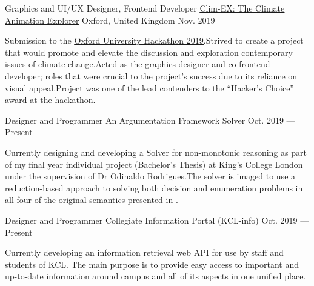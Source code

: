 

\begin{cventries}

\cventry
{Graphics and UI/UX Designer, Frontend Developer} %
{\href{https://github.com/davzzar/clim-AX}{\uline{Clim-EX: The Climate Animation Explorer}}} %
{Oxford, United Kingdom} %
{Nov. 2019} %
{
    \begin{cvitems}
    \bsep Submission to the \href{http://www.ox.ac.uk/students/news/2019-10-14-oxford-hack-2019}{\uline{Oxford University Hackathon 2019}}.\bsep Strived to create a project that would promote and elevate the discussion and exploration contemporary issues of climate change.\bsep Acted as the graphics designer and co-frontend developer; roles that were crucial to the project's success due to its reliance on visual appeal.\bsep Project was one of the lead contenders to the ``Hacker's Choice'' award at the hackathon.
    \end{cvitems}
}

    \cventry
    {Designer and Programmer} %
    {An Argumentation Framework Solver} %
    {} %
    {Oct. 2019 --- Present} %
    {
        \begin{cvitems}
            \bsep Currently designing and developing a \href{https://www.sciencedirect.com/science/article/pii/000437029400041X}{} Solver for non-monotonic reasoning as part of my final year individual project (Bachelor's Thesis) at King's College London under the supervision of Dr Odinaldo Rodrigues.\bsep The solver is imaged to use a reduction-based approach to solving both decision and enumeration problems in all four of the original semantics presented in \href{https://www.sciencedirect.com/science/article/pii/000437029400041X}{}.
        \end{cvitems}
    }

    \cventry
    {Designer and Programmer} %
    {Collegiate Information Portal (KCL-info)} %
    {} %
    {Oct. 2019 --- Present} %
    {
        \begin{cvitems}
            \bsep Currently developing an information retrieval web API for use by staff and students of KCL. The main purpose is to provide easy access to important and up-to-date information around campus and all of its aspects in one unified place.
        \end{cvitems}
    }


\end{cventries}
